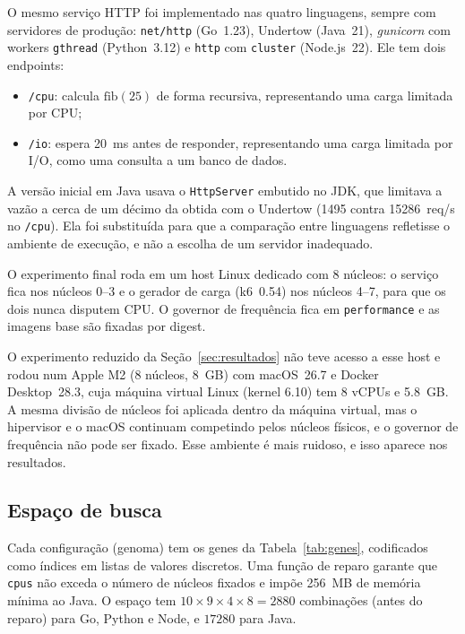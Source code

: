 \documentclass[11pt,a4paper]{article}
\begin{document}
O mesmo serviço HTTP foi implementado nas quatro linguagens, sempre com servidores de produção: \texttt{net/http} (Go~1.23),
Undertow (Java~21), \emph{gunicorn} com workers \texttt{gthread} (Python~3.12) e \texttt{http} com \texttt{cluster} (Node.js~22).
Ele tem dois endpoints:
\begin{itemize}
  \item \texttt{/cpu}: calcula $\mathrm{fib}(25)$ de forma recursiva, representando uma carga limitada por CPU;
  \item \texttt{/io}: espera \SI{20}{ms} antes de responder, representando uma carga limitada por I/O, como uma consulta a um banco de dados.
\end{itemize}
A versão inicial em Java usava o \texttt{HttpServer} embutido no JDK, que limitava a vazão a cerca de um décimo da
obtida com o Undertow (\SI{1495}{} contra \SI{15286}{req/s} no \texttt{/cpu}). Ela foi substituída para que a comparação
entre linguagens refletisse o ambiente de execução, e não a escolha de um servidor inadequado.

O experimento final roda em um host Linux dedicado com 8 núcleos: o serviço fica nos núcleos 0--3 e o gerador de carga
(k6~0.54) nos núcleos 4--7, para que os dois nunca disputem CPU. O governor de frequência fica em \texttt{performance}
e as imagens base são fixadas por digest.

O experimento reduzido da Seção~\ref{sec:resultados} não teve acesso a esse host e rodou num Apple M2 (8 núcleos,
\SI{8}{GB}) com macOS~26.7 e Docker Desktop~28.3, cuja máquina virtual Linux (kernel 6.10) tem 8 vCPUs e \SI{5,8}{GB}.
A mesma divisão de núcleos foi aplicada dentro da máquina virtual, mas o hipervisor e o macOS continuam competindo pelos
núcleos físicos, e o governor de frequência não pode ser fixado. Esse ambiente é mais ruidoso, e isso aparece nos resultados.

\subsection{Espaço de busca}

Cada configuração (genoma) tem os genes da Tabela~\ref{tab:genes}, codificados como índices em listas de valores
discretos. Uma função de reparo garante que \texttt{cpus} não exceda o número de núcleos fixados e impõe
\SI{256}{MB} de memória mínima ao Java. O espaço tem $10 \times 9 \times 4 \times 8 = 2880$ combinações (antes do
reparo) para Go, Python e Node, e $17280$ para Java.
\end{document}
